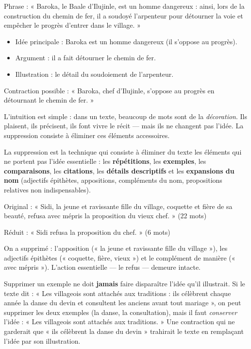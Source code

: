 \documentclass[11pt]{article}
\newcommand{\cle}[1]{{\popxbold\color{popdark}#1}}
\newcounter{popsec}
\newcounter{popsub}
\newcommand{\courssub}[1]{%
  \stepcounter{popsub}%
  \par\vspace{9pt}\noindent{\popxbold\fontsize{11.5}{13}\selectfont\color{popink}{\color{poporange}\thepopsec.\thepopsub}\hspace{6pt}#1}\par\nopagebreak\vspace{4pt}
}
\begin{document}
\begin{exemplebox}
Phrase : « Baroka, le Baale d'Ilujinle, est un homme dangereux : ainsi, lors de la construction du chemin de fer, il a soudoyé l'arpenteur pour détourner la voie et empêcher le progrès d'entrer dans le village. »
\begin{itemize}
\item Idée principale : Baroka est un homme dangereux (il s'oppose au progrès).
\item Argument : il a fait détourner le chemin de fer.
\item Illustration : le détail du soudoiement de l'arpenteur.
\end{itemize}
Contraction possible : « Baroka, chef d'Ilujinle, s'oppose au progrès en détournant le chemin de fer. »
\end{exemplebox}

\courssub{Technique 1 : la suppression}

L'intuition est simple : dans un texte, beaucoup de mots sont de la \emph{décoration}. Ils plaisent, ils précisent, ils font vivre le récit — mais ils ne changent pas l'idée. La \cle{suppression} consiste à éliminer ces éléments accessoires.

\begin{definition}[La suppression]
La suppression est la technique qui consiste à éliminer du texte les éléments qui ne portent pas l'idée essentielle : les \textbf{répétitions}, les \textbf{exemples}, les \textbf{comparaisons}, les \textbf{citations}, les \textbf{détails descriptifs} et les \textbf{expansions du nom} (adjectifs épithètes, appositions, compléments du nom, propositions relatives non indispensables).
\end{definition}

\begin{exemplebox}
Original : « Sidi, la jeune et ravissante fille du village, coquette et fière de sa beauté, refusa avec mépris la proposition du vieux chef. » (22 mots)

Réduit : « Sidi refusa la proposition du chef. » (6 mots)

On a supprimé : l'apposition (« la jeune et ravissante fille du village »), les adjectifs épithètes (« coquette, fière, vieux ») et le complément de manière (« avec mépris »). L'action essentielle — le refus — demeure intacte.
\end{exemplebox}

\begin{attention}
Supprimer un exemple ne doit \textbf{jamais} faire disparaître l'idée qu'il illustrait. Si le texte dit : « Les villageois sont attachés aux traditions : ils célèbrent chaque année la danse du devin et consultent les anciens avant tout mariage », on peut supprimer les deux exemples (la danse, la consultation), mais il faut \emph{conserver} l'idée : « Les villageois sont attachés aux traditions. » Une contraction qui ne garderait que « ils célèbrent la danse du devin » trahirait le texte en remplaçant l'idée par son illustration.
\end{attention}
\end{document}
